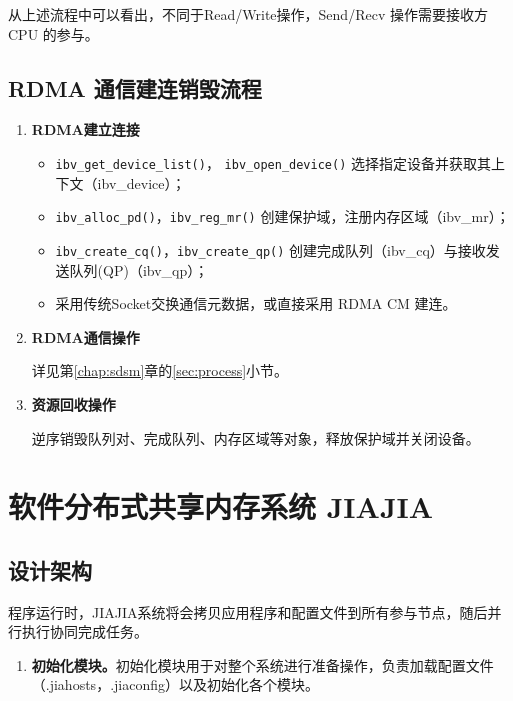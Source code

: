 {\begin{enumerate}[label=\arabic*.]
              从上述流程中可以看出，不同于Read/Write操作，Send/Recv 操作需要接收方 CPU 的参与。
    \end{enumerate}

    \subsection{RDMA 通信建连销毁流程}

    \begin{enumerate}[label=\textbf{步骤 \arabic*.}, leftmargin=0.5cm, align=left]
        \item \textbf{RDMA建立连接}
              \begin{itemize}
                  \item \texttt{ibv\_get\_device\_list()}， \texttt{ibv\_open\_device()}
                        选择指定设备并获取其上下文（ibv\_device）；
                  \item \texttt{ibv\_alloc\_pd()}，\texttt{ibv\_reg\_mr()} 创建保护域，注册内存区域（ibv\_mr）；
                  \item \texttt{ibv\_create\_cq()}，\texttt{ibv\_create\_qp()} 创建完成队列（ibv\_cq）与接收发送队列(QP)（ibv\_qp）；
                  \item 采用传统Socket交换通信元数据，或直接采用 RDMA CM 建连。
              \end{itemize}

        \item \textbf{RDMA通信操作}

              详见第\ref{chap:sdsm}章的\ref{sec:process}小节。

        \item \textbf{资源回收操作}

              逆序销毁队列对、完成队列、内存区域等对象，释放保护域并关闭设备。
    \end{enumerate}

    \section{软件分布式共享内存系统 JIAJIA}\label{软件分布式共享内存系统 JIAJIA}
    \subsection{设计架构}

    程序运行时，JIAJIA系统将会拷贝应用程序和配置文件到所有参与节点，随后并行执行协同完成任务。

    \begin{enumerate}[label=\arabic*.]
        \item \textbf{初始化模块。}初始化模块用于对整个系统进行准备操作，负责加载配置文件（.jiahosts，.jiaconfig）以及初始化各个模块。


\end{enumerate}}

